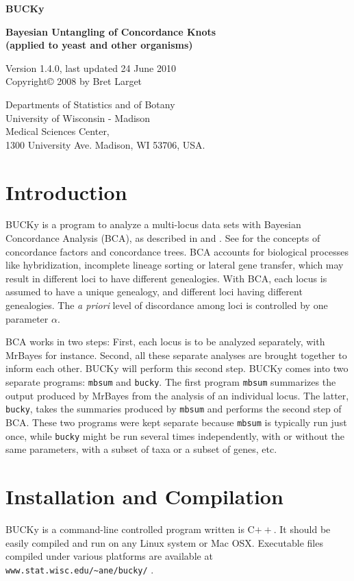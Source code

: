\documentclass[12pt,english,final,letterpaper]{article}
\newcommand{\bu}{BUCKy}
\begin{document}
\begin{center}
{\Large\bf BUCKy}

{\bf Bayesian Untangling of Concordance Knots\\
(applied to yeast and other organisms)}
\bigskip

Version 1.4.0, last updated 24 June 2010\\
Copyright\copyright{} 2008 by Bret Larget\\
\medskip

{\small
Departments of Statistics and of Botany\\ 
University of Wisconsin - Madison\\ 
Medical Sciences Center,\\ 
1300 University Ave. Madison, WI 53706, USA.
}
\end{center}


\section{Introduction}
\bu{} is a program to analyze a multi-locus data sets with 
Bayesian Concordance Analysis (BCA), as described in \cite{ane-etal-2007}
and \cite{larget-etal-2010}.
See \cite{baum-2007} for the concepts of concordance factors and
concordance trees.
BCA accounts for biological processes like hybridization, 
incomplete lineage sorting or lateral gene transfer, which may result
in different loci to have different genealogies. With BCA,
each locus is assumed to have a unique genealogy, and different
loci having different genealogies. The {\it a priori} level of 
discordance among loci is controlled by one parameter $\alpha$.

BCA works in two steps: First, each locus is to be analyzed 
separately, with MrBayes for instance. Second, all these separate
analyses are brought together to inform each other. \bu{} will
perform this second step.
\bu{} comes into two separate programs: {\tt mbsum} and {\tt bucky}.
The first program {\tt mbsum} summarizes the output produced by MrBayes
from the analysis of an individual locus. The latter, {\tt bucky}, 
takes the summaries produced by {\tt mbsum} and performs the second step
of BCA. These two programs were kept separate because {\tt mbsum}
is typically run just once, while {\tt bucky} might be run several
times  independently, with or without the same parameters, with
a subset of taxa or a subset of genes, etc.

\section{Installation and Compilation}
\bu{} is a command-line controlled program written is C$++$.
It should be easily compiled and run on any Linux system or Mac OSX.
Executable files compiled under various platforms are available
at \verb+www.stat.wisc.edu/~ane/bucky/+ .
\end{document}
